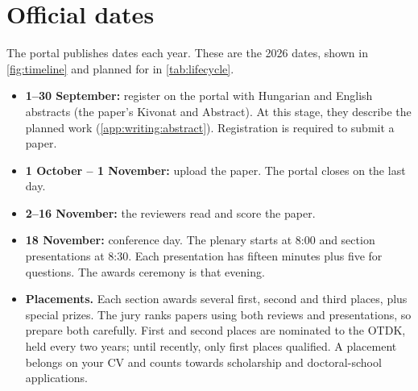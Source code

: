 \section{Official dates}\label{app:tdk:dates}
The portal publishes dates each year. These are the 2026 dates, shown in \cref{fig:timeline} and planned for in \cref{tab:lifecycle}.
\begin{itemize}
  \item \textbf{1--30 September:} register on the portal with Hungarian and English abstracts (the paper's Kivonat and Abstract). At this stage, they describe the planned work (\cref{app:writing:abstract}). Registration is required to submit a paper.
  \item \textbf{1 October -- 1 November:} upload the paper. The portal closes on the last day.
  \item \textbf{2--16 November:} the reviewers read and score the paper.
  \item \textbf{18 November:} conference day. The plenary starts at 8:00 and section presentations at 8:30. Each presentation has fifteen minutes plus five for questions. The awards ceremony is that evening.
  \item \textbf{Placements.} Each section awards several first, second and third places, plus special prizes. The jury ranks papers using both reviews and presentations, so prepare both carefully. First and second places are nominated to the OTDK, held every two years; until recently, only first places qualified. A placement belongs on your CV and counts towards scholarship and doctoral-school applications.
\end{itemize}


